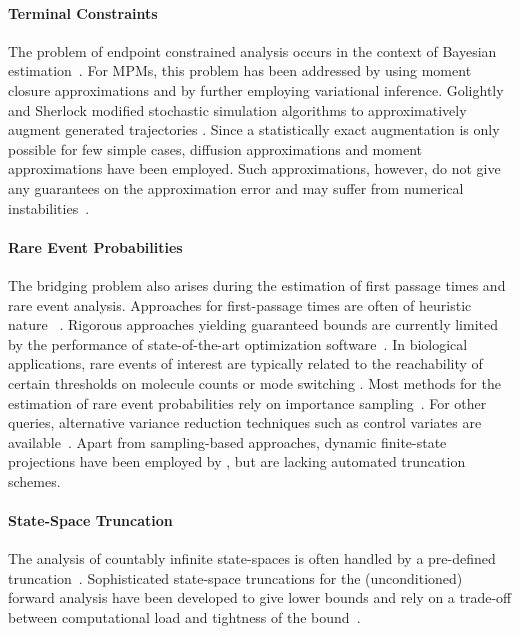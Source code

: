 \paragraph{Terminal Constraints}
The problem of endpoint constrain\-ed analysis occurs in the context of Bayesian estimation~\cite{sarkka2013bayesian}. 
For \acp{MPM}, this problem has been addressed by \citet{huang2016reconstructing} using moment closure approximations and by \citet{wildner2019moment} further employing variational inference.
Golightly and Sherlock modified stochastic simulation algorithms to approximatively  
augment generated trajectories  \cite{golightly2019efficient}.
Since a statistically exact augmentation is only possible for few simple cases, diffusion approximations \cite{golightly2005bayesian} and moment approximations \cite{milner2013moment} have been employed.
Such approximations, however, do not give any guarantees on the approximation error
and may suffer from numerical instabilities~\cite{schnoerr2014validity}.

\paragraph{Rare Event Probabilities}
The bridging problem also arises during the estimation of first passage times and rare event analysis.
Approaches for first-passage times are often of heuristic nature ~\cite{schnoerr2017efficient,hayden2012fluid,bortolussi2014stochastic}. Rigorous approaches yielding guaranteed bounds are currently limited by the performance of state-of-the-art optimization software~\cite{backenkohler2019bounding}.
In biological applications, rare events of interest are typically related to the reachability of certain thresholds on molecule counts   or mode switching \cite{strasser2012stability}.
Most methods for the estimation of rare event probabilities  rely on  importance sampling~\cite{kuwahara2008efficient,daigle2011automated}.
For other queries, alternative variance reduction techniques such as control variates are available~\cite{backenkohler2019control}.
Apart from sampling-based approaches, dynamic finite-state projections have been employed by \citet{mikeev2013numerical}, but are lacking automated truncation schemes.

\paragraph{State-Space Truncation}
The analysis of countably infinite state-spaces is often handled by a pre-defined truncation~\cite{kwiatkowska2011prism}.
Sophisticated state-space truncations for the (unconditioned) forward analysis have been developed to give lower bounds and rely on a trade-off between computational load and tightness of the bound~\cite{munsky2006finite,lapin2011shave,andreychenko2011parameter,henzinger2009sliding,mikeev2013fly}.

